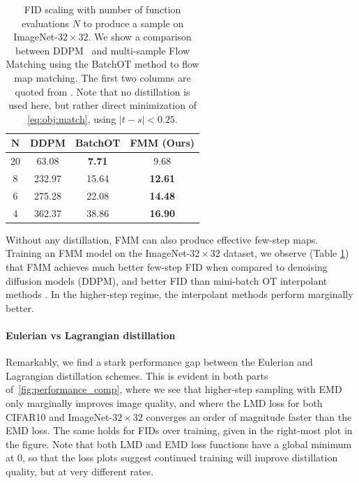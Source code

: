 %
\begin{table} %
	\vspace{2.5mm}
	\centering
	\begin{tabular}{cccc}
		\toprule
		$\mathbf{N}$ & \textbf{DDPM} & \textbf{BatchOT} & \textbf{FMM (Ours)} \\
		\midrule
		20           & 63.08         & \textbf{7.71}    & 9.68                \\
		8            & 232.97        & 15.64            & \textbf{12.61}      \\
		6            & 275.28        & 22.08            & \textbf{14.48}      \\
		4            & 362.37        & 38.86            & \textbf{16.90}      \\
		\bottomrule
	\end{tabular}
	\caption{FID scaling with number of function evaluations $N$ to produce a sample on ImageNet-$32\times32$.
		We show a comparison between DDPM~\citep{ho2020denoising} and multi-sample Flow Matching using the BatchOT method \citep{pooladian2023multisample} to flow map matching.
		The first two columns are quoted from \citet{pooladian2023multisample}.
		Note that no distillation is used here, but rather direct minimization of \eqref{eq:obj:match}, using $|t-s| < 0.25$.
	}
	\label{tab:scaling}
\end{table}
%
Without any distillation, FMM can also produce effective few-step maps.
%
Training an FMM model on the ImageNet-$32\times32$ dataset, we observe (Table \ref{tab:scaling}) that FMM achieves much better few-step FID when compared to denoising diffusion models (DDPM), and better FID than mini-batch OT interpolant methods \citep{pooladian2023multisample}.
%
In the higher-step regime, the interpolant methods perform marginally better.

\paragraph{Eulerian vs Lagrangian distillation}
Remarkably, we find a stark performance gap between the Eulerian and Lagrangian distillation schemes.
%
This is evident in both parts of~\cref{fig:performance_comp}, where we see that higher-step sampling with EMD only marginally improves image quality, and where the LMD loss for both CIFAR10 and ImageNet-$32\times32$ converges an order of magnitude faster than the EMD loss.
%
The same holds for FIDs over training, given in the right-most plot in the figure.
%
Note that both LMD and EMD loss functions have a global minimum at 0, so that the loss plots suggest continued training will improve distillation quality, but at very different rates.

